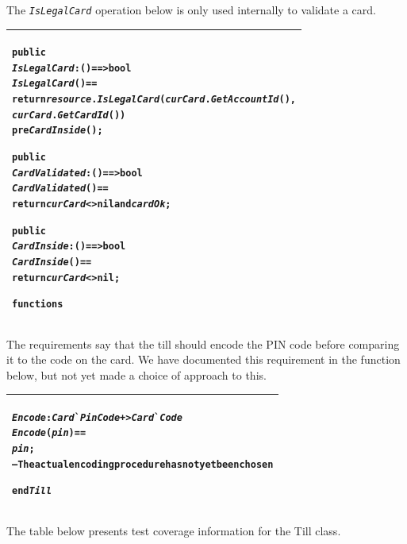 \documentclass[\pformat,12pt,twoside]{article}
\newenvironment{VDMgray}%
{\begin{tabular}{|G|}\hline\small\begin{alltt}}%
{\end{alltt}\normalsize\\
 \hline\end{tabular}}
\begin{document}
The \texttt{\emph{IsLegalCard}} operation below is only used internally to validate 
a card.

\begin{VDMgray}
 \textbf{public}
 \textit{IsLegalCard} : () ==\texttt{>} \textbf{bool}
 \textit{IsLegalCard}() ==
   \textbf{return} \textit{resource}.\textit{IsLegalCard}(\textit{curCard}.\textit{GetAccountId}(),
                               \textit{curCard}.\textit{GetCardId}())
 \textbf{pre} \textit{CardInside}();

 \textbf{public}
 \textit{CardValidated}: () ==\texttt{>} \textbf{bool}
 \textit{CardValidated}() ==
   \textbf{return} \textit{curCard} \texttt{<}\texttt{>} \textbf{nil} \textbf{and} \textit{cardOk};

 \textbf{public}
 \textit{CardInside}: () ==\texttt{>} \textbf{bool}
 \textit{CardInside}() ==
   \textbf{return} \textit{curCard} \texttt{<}\texttt{>} \textbf{nil};

\textbf{functions}
\end{VDMgray}


The requirements say that the till should encode the PIN code 
before comparing it to the code on the card. We have documented 
this requirement in the function below, but not yet made a choice 
of approach to this.

\begin{VDMgray}
 \textit{Encode}: \textit{Card}\`{}\textit{PinCode} +\texttt{>} \textit{Card}\`{}\textit{Code}
 \textit{Encode}(\textit{pin}) ==
   \textit{pin};
   -- The actual encoding procedure has not yet been chosen

\textbf{end} \textit{Till}
\end{VDMgray}


The table below presents test coverage information for the Till 
class.
\end{document}
